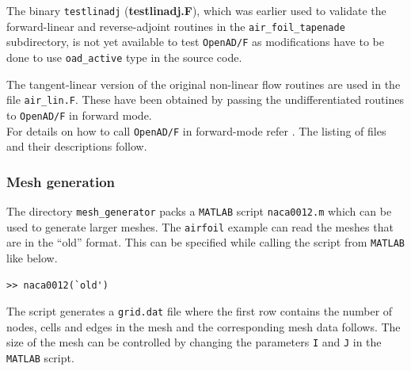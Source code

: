 \begin{TodoPar}\noindent The binary \texttt{testlinadj} (\textbf{{testlinadj.F}}), which was earlier used to validate the forward-linear and reverse-adjoint routines in the \texttt{air\_foil\_tapenade} subdirectory, is not yet available to test \texttt{OpenAD/F} as modifications have to be done to use \texttt{oad\_active} type in the source code.\end{TodoPar}

\noindent The tangent-linear version of the original non-linear flow routines are used in the file  \texttt{air\_lin.F}. These have been obtained by passing the undifferentiated routines to \texttt{OpenAD/F} in forward mode.\\

\noindent For details on how to call \texttt{OpenAD/F} in forward-mode refer \cite{Utke_2014}. The listing of files and their descriptions follow.\\

\clearpage
\subsubsection{Mesh generation}\label{mesh_gen}
The directory \texttt{mesh\_generator} packs a \texttt{MATLAB} script \texttt{naca0012.m} which can be used to generate larger meshes. The \texttt{airfoil} example can read the meshes that are in the ``old'' format. This can be specified while calling the script from \texttt{MATLAB} like below.
\hfill\break
\begin{lstlisting}[language=mymatlab, numbers=none]
>> naca0012(`old')
\end{lstlisting}
The script generates a \texttt{grid.dat} file where the first row contains the number of nodes, cells and edges in the mesh and the corresponding mesh data follows. The size of the mesh can be controlled by changing the parameters \texttt{I} and \texttt{J} in the \texttt{MATLAB} script.

